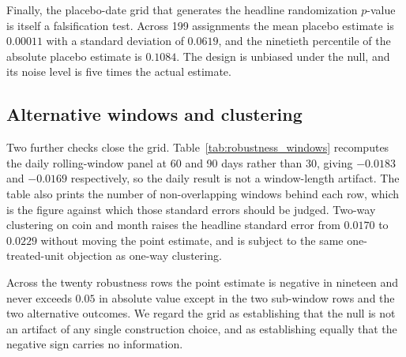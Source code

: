 \documentclass[12pt,a4paper]{article}
\begin{document}
Finally, the placebo-date grid that generates the headline randomization $p$-value is itself a falsification test. Across
199 assignments the mean placebo estimate is
$0.00011$ with a standard deviation of
$0.0619$, and the ninetieth percentile of the absolute placebo estimate is
$0.1084$. The design is unbiased under the null, and its noise level is five times the actual estimate.

\subsection{Alternative windows and clustering}

Two further checks close the grid. Table~\ref{tab:robustness_windows} recomputes the daily rolling-window panel at 60 and 90 days rather than 30, giving
$-0.0183$ and $-0.0169$ respectively, so the daily result is not a window-length artifact. The table also prints the number of non-overlapping windows behind each row, which is the figure against which those standard errors should be judged. Two-way clustering on coin and month raises the headline standard error from $0.0170$ to
$0.0229$ without moving the point estimate, and is subject to the same one-treated-unit objection as one-way clustering.



Across the twenty robustness rows the point estimate is negative in nineteen and never exceeds $0.05$ in absolute value except in the two sub-window rows and the two alternative outcomes. We regard the grid as establishing that the null is not an artifact of any single construction choice, and as establishing equally that the negative sign carries no information.
\end{document}
